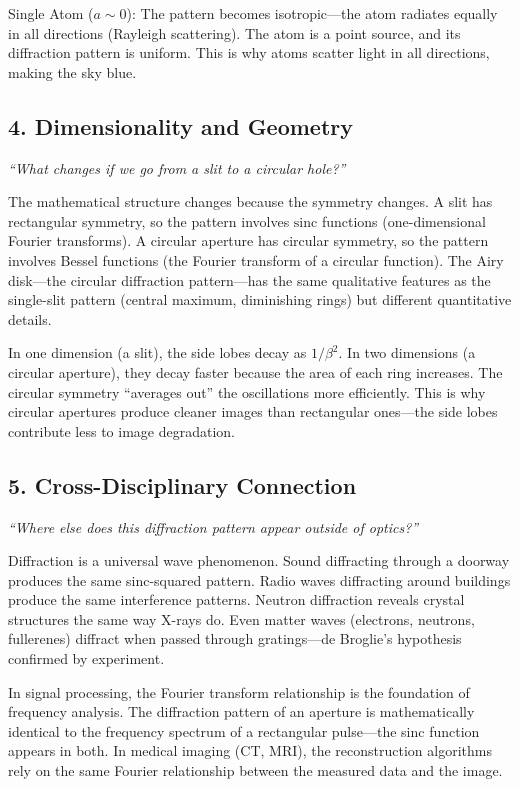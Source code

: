 Single Atom ($a \sim 0$): The pattern becomes isotropic---the atom radiates equally in all directions (Rayleigh scattering). The atom is a point source, and its diffraction pattern is uniform. This is why atoms scatter light in all directions, making the sky blue.

\subsection*{4. Dimensionality and Geometry}
\textit{``What changes if we go from a slit to a circular hole?''}

The mathematical structure changes because the symmetry changes. A slit has rectangular symmetry, so the pattern involves $\text{sinc}$ functions (one-dimensional Fourier transforms). A circular aperture has circular symmetry, so the pattern involves Bessel functions (the Fourier transform of a circular function). The Airy disk---the circular diffraction pattern---has the same qualitative features as the single-slit pattern (central maximum, diminishing rings) but different quantitative details.

In one dimension (a slit), the side lobes decay as $1/\beta^2$. In two dimensions (a circular aperture), they decay faster because the area of each ring increases. The circular symmetry ``averages out'' the oscillations more efficiently. This is why circular apertures produce cleaner images than rectangular ones---the side lobes contribute less to image degradation.

\subsection*{5. Cross-Disciplinary Connection}
\textit{``Where else does this diffraction pattern appear outside of optics?''}

Diffraction is a universal wave phenomenon. Sound diffracting through a doorway produces the same sinc-squared pattern. Radio waves diffracting around buildings produce the same interference patterns. Neutron diffraction reveals crystal structures the same way X-rays do. Even matter waves (electrons, neutrons, fullerenes) diffract when passed through gratings---de Broglie's hypothesis confirmed by experiment.

In signal processing, the Fourier transform relationship is the foundation of frequency analysis. The diffraction pattern of an aperture is mathematically identical to the frequency spectrum of a rectangular pulse---the sinc function appears in both. In medical imaging (CT, MRI), the reconstruction algorithms rely on the same Fourier relationship between the measured data and the image.

